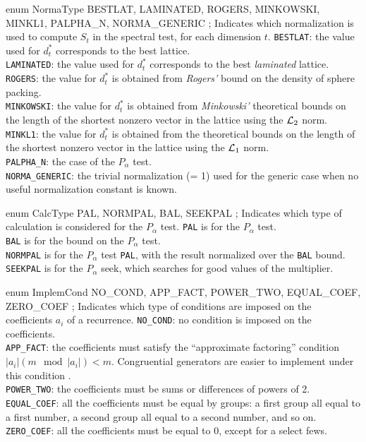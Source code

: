 {enum NormaType { BESTLAT, LAMINATED, ROGERS, MINKOWSKI, MINKL1,
                 PALPHA_N, NORMA_GENERIC };
\endcode
\tab
 Indicates which normalization is used to compute
 $S_t$ in the spectral test, for each dimension $t$.
\endtab
\tabb
  \texttt{BESTLAT}: the value used for $d_t^*$ corresponds to 
   the best lattice.\\[1ex]
 \texttt{LAMINATED}: the value used for $d_t^*$ corresponds to 
  the best \emph{laminated} lattice.\\[1ex]
 \texttt{ROGERS}:  the value for $d_t^*$ is obtained from \emph{Rogers'} bound
  on the density of sphere packing.\\[1ex]
 \texttt{MINKOWSKI}: the value for $d_t^*$ is obtained from \emph{Minkowski'}
 theoretical bounds on the length of the shortest nonzero vector in the lattice
 using the ${\cal L}_2$ norm.\\[1ex]
 \texttt{MINKL1}: the value for $d_t^*$ is obtained from the theoretical bounds on
 the length of the shortest nonzero vector in the lattice using the ${\cal L}_1$
 norm.\\[1ex]
  \texttt{PALPHA\_N}: the case of the $P_\alpha$ test.\\[1ex]
  \texttt{NORMA\_GENERIC}: the trivial normalization (= 1) used for the generic
  case when no useful normalization constant is known. 
\endtabb
\code


enum CalcType { PAL, NORMPAL, BAL, SEEKPAL };
\endcode
\tab
Indicates which type of calculation is considered for the $P_\alpha$ test.
\label{CalcType.def}
\endtab
\tabb
\texttt{PAL} is for the $P_\alpha$ test. \\[1ex]
\texttt{BAL} is for the bound on the $P_\alpha$ test. \\[1ex] 
\texttt{NORMPAL} is for the $P_\alpha$ test \texttt{PAL}, with the result 
normalized over the \texttt{BAL} bound. \\[1ex]
\texttt{SEEKPAL} is for the $P_\alpha$ seek, which searches for good values
  of the multiplier.
\endtabb
\code


enum ImplemCond { NO_COND, APP_FACT, POWER_TWO, EQUAL_COEF, ZERO_COEF };
\endcode
\tab
  Indicates which type of conditions are imposed
  on the coefficients $a_i$ of a recurrence.
\endtab
\tabb
  \texttt{NO\_COND}:  no condition is imposed on the coefficients.\\[1ex]
  \texttt{APP\_FACT}: the coefficients must satisfy the ``approximate factoring''
  condition $|a_i| (m\mod |a_i|) < m$. Congruential generators are easier to
  implement under this condition \cite{rLEC90a}.\\[1ex]
  \texttt{POWER\_TWO}: the coefficients must be sums or differences of powers
   of 2.\\[1ex]
 \texttt{EQUAL\_COEF}: all the coefficients must be equal by groups:
    a first group all equal to a first number, a second group all equal to a
    second number, and so on. \\[1ex]
 \texttt{ZERO\_COEF}: all the coefficients must be equal to 0, except for a
   select fews.
\endtabb
\code


}
